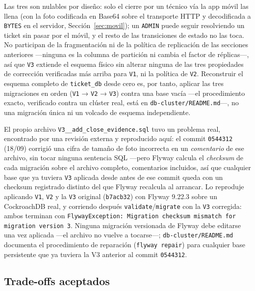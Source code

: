 Las tres son nulables por diseño: solo el cierre por un técnico vía la app móvil las llena (con la
foto codificada en Base64 sobre el transporte HTTP y decodificada a \texttt{BYTES} en el servidor,
Sección~\ref{sec:movil}); un \texttt{ADMIN} puede seguir resolviendo un ticket sin pasar
por el móvil, y el resto de las transiciones de estado no las toca. No participan de la
fragmentación ni de la política de replicación de las secciones anteriores —ninguna es la columna
de partición ni cambia el factor de réplicas—, así que \texttt{V3} extiende el esquema físico sin
alterar ninguna de las tres propiedades de corrección verificadas más arriba para \texttt{V1}, ni
la política de \texttt{V2}. Reconstruir el esquema completo de \texttt{ticket\_db} desde cero es,
por tanto, aplicar las tres migraciones en orden (\texttt{V1} → \texttt{V2} → \texttt{V3}) contra
una base vacía —el procedimiento exacto, verificado contra un clúster real, está en
\texttt{db-cluster/README.md}—, no una migración única ni un volcado de esquema independiente.

El propio archivo \texttt{V3\_\_add\_close\_evidence.sql} tuvo un problema real, encontrado por
una revisión externa y reproducido aquí: el commit \texttt{0544312} (18/09) corrigió una cifra de
tamaño de foto incorrecta en un \emph{comentario} de ese archivo, sin tocar ninguna sentencia SQL
—pero Flyway calcula el \emph{checksum} de cada migración sobre el archivo completo, comentarios
incluidos, así que cualquier base que ya tuviera \texttt{V3} aplicada desde antes de ese commit
queda con un checksum registrado distinto del que Flyway recalcula al arrancar. Lo reproduje
aplicando \texttt{V1}, \texttt{V2} y la \texttt{V3} original (\texttt{b7acb32}) con Flyway 9.22.3
sobre un CockroachDB real, y corriendo después \texttt{validate}/\texttt{migrate} con la
\texttt{V3} corregida: ambos terminan con \texttt{FlywayException: Migration checksum mismatch
for migration version 3}. Ninguna migración versionada de Flyway debe editarse una vez aplicada
—el archivo no vuelve a tocarse—; \texttt{db-cluster/README.md} documenta el procedimiento de
reparación (\texttt{flyway repair}) para cualquier base persistente que ya tuviera la V3 anterior
al commit \texttt{0544312}.

\subsection{Trade-offs aceptados}

